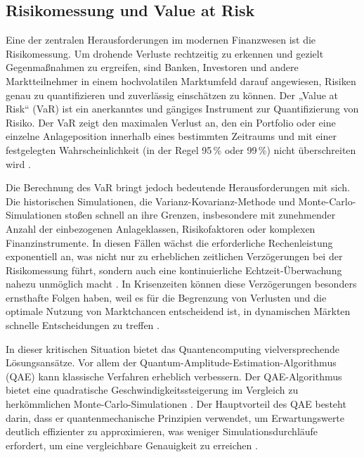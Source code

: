 \subsection{Risikomessung und Value at Risk}
Eine der zentralen Herausforderungen im modernen Finanzwesen ist die Risikomessung. Um drohende Verluste rechtzeitig zu erkennen und gezielt Gegenmaßnahmen zu ergreifen, sind Banken, Investoren und andere Marktteilnehmer in einem hochvolatilen Marktumfeld darauf angewiesen, Risiken genau zu quantifizieren und zuverlässig einschätzen zu können. Der „Value at Risk“ (VaR) ist ein anerkanntes und gängiges Instrument zur Quantifizierung von Risiko. Der VaR zeigt den maximalen Verlust an, den ein Portfolio oder eine einzelne Anlageposition innerhalb eines bestimmten Zeitraums und mit einer festgelegten Wahrscheinlichkeit (in der Regel 95\,\% oder 99\,\%) nicht überschreiten wird \cite{springer2025,plos2024}.

Die Berechnung des VaR bringt jedoch bedeutende Herausforderungen mit sich. Die historischen Simulationen, die Varianz-Kovarianz-Methode und Monte-Carlo-Simulationen stoßen schnell an ihre Grenzen, insbesondere mit zunehmender Anzahl der einbezogenen Anlageklassen, Risikofaktoren oder komplexen Finanzinstrumente. In diesen Fällen wächst die erforderliche Rechenleistung exponentiell an, was nicht nur zu erheblichen zeitlichen Verzögerungen bei der Risikomessung führt, sondern auch eine kontinuierliche Echtzeit-Überwachung nahezu unmöglich macht \cite{plos2024,bouland2020}. In Krisenzeiten können diese Verzögerungen besonders ernsthafte Folgen haben, weil es für die Begrenzung von Verlusten und die optimale Nutzung von Marktchancen entscheidend ist, in dynamischen Märkten schnelle Entscheidungen zu treffen \cite{orus2018}.

In dieser kritischen Situation bietet das Quantencomputing vielversprechende Lösungsansätze. Vor allem der Quantum-Amplitude-Estimation-Algorithmus (QAE) kann klassische Verfahren erheblich verbessern. Der QAE-Algorithmus bietet eine quadratische Geschwindigkeitssteigerung im Vergleich zu herkömmlichen Monte-Carlo-Simulationen \cite{quantumjournal2020,rebentrost2018}. Der Hauptvorteil des QAE besteht darin, dass er quantenmechanische Prinzipien verwendet, um Erwartungswerte deutlich effizienter zu approximieren, was weniger Simulationsdurchläufe erfordert, um eine vergleichbare Genauigkeit zu erreichen \cite{quantumjournal2020,martin2022}.

